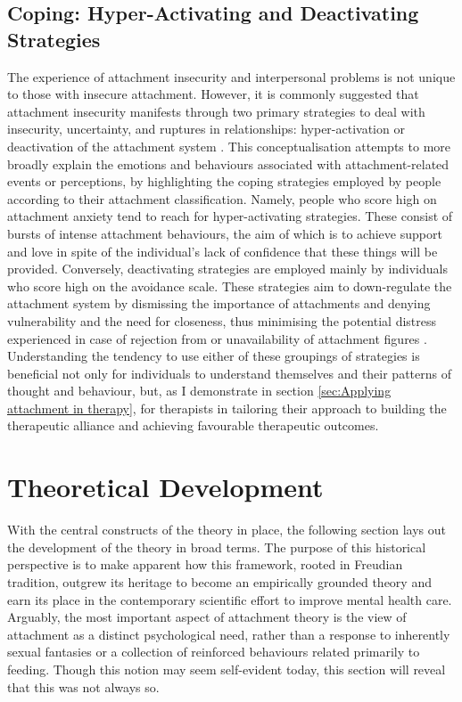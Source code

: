 \documentclass[12pt]{report}
\begin{document}
\subsection*{Coping: Hyper-Activating and Deactivating Strategies}
The experience of attachment insecurity and interpersonal problems is not unique to those with insecure attachment.
However, it is commonly suggested that attachment insecurity manifests through two primary strategies to deal with insecurity, uncertainty, and ruptures in relationships: hyper-activation or deactivation of the attachment system \cite{Mikulincer2003, Mikulincer2013,Tyrrell1999, Slade2016}.
This conceptualisation attempts to more broadly explain the emotions and behaviours associated with attachment-related events or perceptions, by highlighting the coping strategies employed by people according to their attachment classification.
Namely, people who score high on attachment anxiety tend to reach for hyper-activating strategies.
These consist of bursts of intense attachment behaviours, the aim of which is to achieve support and love in spite of the individual's lack of confidence that these things will be provided.
Conversely, deactivating strategies are employed mainly by individuals who score high on the avoidance scale.
These strategies aim to down-regulate the attachment system by dismissing the importance of attachments and denying vulnerability and the need for closeness, thus minimising the potential distress experienced in case of rejection from or unavailability of attachment figures \cite{Mikulincer2003}.
Understanding the tendency to use either of these groupings of strategies is beneficial not only for individuals to understand themselves and their patterns of thought and behaviour, but, as I demonstrate in section \ref{sec:Applying attachment in therapy}, for therapists in tailoring their approach to building the therapeutic alliance and achieving favourable therapeutic outcomes.

\section{Theoretical Development}
With the central constructs of the theory in place, the following section lays out the development of the theory in broad terms.
The purpose of this historical perspective is to make apparent how this framework, rooted in Freudian tradition, outgrew its heritage to become an empirically grounded theory and earn its place in the contemporary scientific effort to improve mental health care.
Arguably, the most important aspect of attachment theory is the view of attachment as a distinct psychological need, rather than a response to inherently sexual fantasies or a collection of reinforced behaviours related primarily to feeding.
Though this notion may seem self-evident today, this section will reveal that this was not always so.
\end{document}
